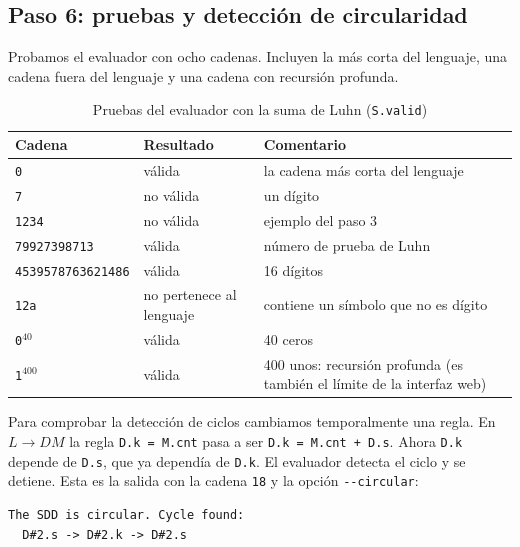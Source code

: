 \documentclass[11pt,a4paper]{article}
\begin{document}
\subsection{Paso 6: pruebas y detección de circularidad}
Probamos el evaluador con ocho cadenas. Incluyen la más corta del lenguaje, una cadena fuera del lenguaje y una cadena con recursión profunda.

\begin{table}[ht]
\centering\small
\begin{tabular}{llp{6.4cm}}
\toprule
Cadena & Resultado & Comentario \\
\midrule
\texttt{0} & válida & la cadena más corta del lenguaje \\
\texttt{7} & no válida & un dígito \\
\texttt{1234} & no válida & ejemplo del paso 3 \\
\texttt{79927398713} & válida & número de prueba de Luhn \\
\texttt{4539578763621486} & válida & 16 dígitos \\
\texttt{12a} & no pertenece al lenguaje & contiene un símbolo que no es dígito \\
\texttt{0}$^{40}$ & válida & 40 ceros \\
\texttt{1}$^{400}$ & válida & 400 unos: recursión profunda (es también el límite de la interfaz web) \\
\bottomrule
\end{tabular}
\caption{Pruebas del evaluador con la suma de Luhn (\texttt{S.valid})}
\end{table}


Para comprobar la detección de ciclos cambiamos temporalmente una regla. En $L\to DM$ la regla \texttt{D.k = M.cnt} pasa a ser \texttt{D.k = M.cnt + D.s}. Ahora \texttt{D.k} depende de \texttt{D.s}, que ya dependía de \texttt{D.k}. El evaluador detecta el ciclo y se detiene. Esta es la salida con la cadena \texttt{18} y la opción \texttt{-{}-circular}:
\begin{small}
\begin{verbatim}
The SDD is circular. Cycle found:
  D#2.s -> D#2.k -> D#2.s
\end{verbatim}
\end{small}
\end{document}
